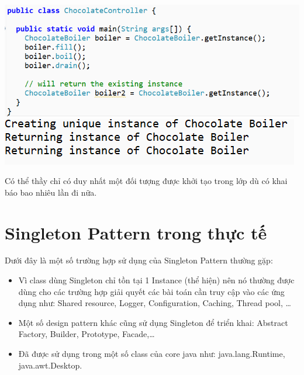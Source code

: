 \begin{center}
\includegraphics[scale=0.75]{GALLEYS/images/chapter1/images2}\\
\vspace{1cm}
\includegraphics{GALLEYS/images/chapter1/images3}
\end{center}
Có thể thầy chỉ có duy nhất một đối tượng được khởi tạo trong lớp dù có khai báo bao nhiêu lần đi nữa.

\section{Singleton Pattern trong thực tế}
Dưới đây là một số trường hợp sử dụng của Singleton Pattern thường gặp:
\begin{itemize}
	\item	Vì class dùng Singleton chỉ tồn tại 1 Instance (thể hiện) nên nó thường được dùng cho các trường hợp giải quyết các bài toán cần truy cập vào các ứng dụng như: Shared resource, Logger, Configuration, Caching, Thread pool, …\\
	\item	Một số design pattern khác cũng sử dụng Singleton để triển khai: Abstract Factory, Builder, Prototype, Facade,…\\
	\item	Đã được sử dụng trong một số class của core java như: java.lang.Runtime, java.awt.Desktop.
\end{itemize}




